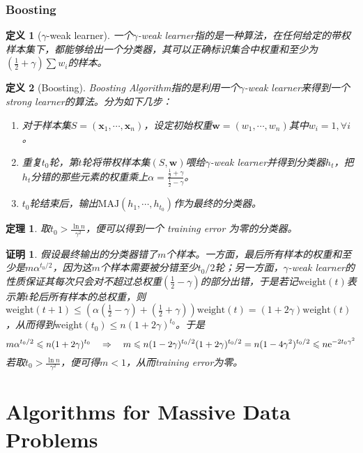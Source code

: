 \documentclass[8pt]{article}
\theoremstyle{compact}
\newtheorem{theorem}{定理}
\newtheorem{definition}{定义}
\newtheorem{Proof}{证明}
\def\le{\leqslant}
\begin{document}
\subsubsection{Boosting}
\begin{definition}[$\gamma$-weak learner]
	一个$\gamma$-weak learner指的是一种算法，在任何给定的带权样本集下，都能够给出一个分类器，其可以正确标识集合中权重和至少为$(\frac12 + \gamma)\sum w_i$的样本。
\end{definition}
\begin{definition}[Boosting]
	Boosting Algorithm指的是利用一个$\gamma$-weak learner来得到一个strong learner的算法。分为如下几步：
	\begin{enumerate}
		\item 对于样本集$S = (\mathbf x_1, \cdots, \mathbf x_n)$，设定初始权重$\mathbf w = (w_1, \cdots, w_n)$其中$w_i = 1, \forall i$。
		\item 重复$t_0$轮，第$t$轮将带权样本集$(S, \mathbf w)$喂给$\gamma$-weak learner并得到分类器$h_t$，把$h_t$分错的那些元素的权重乘上$\alpha = \frac{\frac12 + \gamma}{\frac12 - \gamma}$。
		\item $t_0$轮结束后，输出$\text{MAJ}(h_1, \cdots, h_{t_0})$作为最终的分类器。
	\end{enumerate}
\end{definition}
\begin{theorem}
	取$t_0 > \frac{\ln n}{\gamma^2}$，便可以得到一个 training error 为零的分类器。
\end{theorem}
\begin{Proof}
	假设最终输出的分类器错了$m$个样本。一方面，最后所有样本的权重和至少是$m\alpha^{t_0/2}$，因为这$m$个样本需要被分错至少$t_0/2$轮；另一方面，$\gamma$-weak learner的性质保证其每次只会对不超过总权重$(\frac12 - \gamma)$的部分出错，于是若记$\text{weight}(t)$表示第$t$轮后所有样本的总权重，则$\text{weight}(t+1) \le (\alpha(\frac12 - \gamma) + (\frac12 + \gamma))\text{weight}(t) = (1 + 2\gamma)\text{weight}(t)$，从而得到$\text{weight}(t_0) \le n(1 + 2\gamma)^{t_0}$。于是
	\begin{equation}
	m\alpha^{t_0/2} \le n(1 + 2\gamma)^{t_0} \quad\Rightarrow\quad m \le n(1 - 2\gamma)^{t_0/2}(1 + 2\gamma)^{t_0/2} = n(1 - 4\gamma^2)^{t_0/2} \le n\text e^{-2t_0\gamma^2}
	\end{equation}
	若取$t_0 > \frac{\ln n}{\gamma^2}$，便可得$m < 1$，从而training error为零。
\end{Proof}
\newpage
\section{Algorithms for Massive Data Problems}
\end{document}
